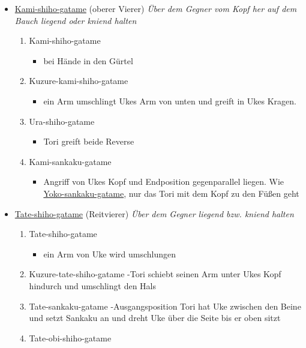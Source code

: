 \documentclass[justified, a4paper, notitlepage, captions=tableheading, nobib]{tufte-handout}
\begin{document}
\begin{itemize}
\item \hyperref[orgc5066bb]{Kami-shiho-gatame} (oberer Vierer)
\emph{Über dem Gegner vom Kopf her auf dem Bauch liegend oder kniend halten}

\begin{enumerate}
\item \label{orgc5066bb}Kami-shiho-gatame         
\begin{itemize}
\item bei Hände in den Gürtel
\end{itemize}
\item \label{orgf04309c}Kuzure-kami-shiho-gatame
\begin{itemize}
\item ein Arm umschlingt Ukes Arm von unten und greift in Ukes Kragen.
\end{itemize}
\item \label{org61b80d8}Ura-shiho-gatame         
\begin{itemize}
\item Tori greift beide Reverse
\end{itemize}
\item \label{org90bea2b}Kami-sankaku-gatame      
\begin{itemize}
\item Angriff von Ukes Kopf und Endposition gegenparallel liegen. Wie \hyperref[orga284efb]{Yoko-sankaku-gatame}, nur das Tori mit dem Kopf zu den Füßen geht
\end{itemize}
\end{enumerate}

\item \hyperref[org5efd028]{Tate-shiho-gatame} (Reitvierer)
\emph{Über dem Gegner liegend bzw. kniend halten}

\begin{enumerate}
\item \label{org5efd028}Tate-shiho-gatame        
\begin{itemize}
\item ein Arm von Uke wird umschlungen
\end{itemize}
\item \label{org204bd96}Kuzure-tate-shiho-gatame 
-Tori schiebt seinen Arm unter Ukes Kopf hindurch und umschlingt den Hals
\item \label{orgf1d84f4}Tate-sankaku-gatame     
-Ausgangsposition Tori hat Uke zwischen den Beine und setzt Sankaku an und dreht Uke über die Seite bis er oben sitzt
\item \label{org105b449}Tate-obi-shiho-gatame
\end{enumerate}
\end{itemize}
\end{document}
